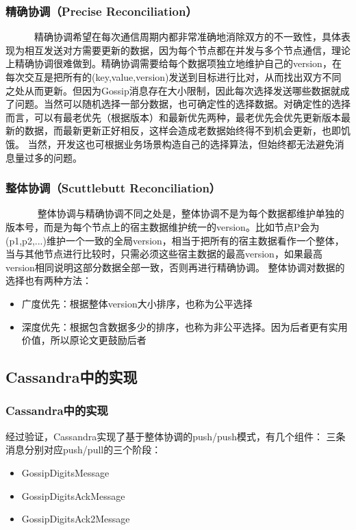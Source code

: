 \documentclass[slidestop,compress,mathserif,c]{beamer}
\begin{document}
\begin{frame}
\frametitle{精确协调（Precise Reconciliation）}
 ~~~~~~精确协调希望在每次通信周期内都非常准确地消除双方的不一致性，具体表现为相互发送对方需要更新的数据，因为每个节点都在并发与多个节点通信，理论上精确协调很难做到。精确协调需要给每个数据项独立地维护自己的version，在每次交互是把所有的(key,value,version)发送到目标进行比对，从而找出双方不同之处从而更新。但因为Gossip消息存在大小限制，因此每次选择发送哪些数据就成了问题。当然可以随机选择一部分数据，也可确定性的选择数据。对确定性的选择而言，可以有最老优先（根据版本）和最新优先两种，最老优先会优先更新版本最新的数据，而最新更新正好相反，这样会造成老数据始终得不到机会更新，也即饥饿。
当然，开发这也可根据业务场景构造自己的选择算法，但始终都无法避免消息量过多的问题。
\end{frame}

\begin{frame}
\frametitle{整体协调（Scuttlebutt Reconciliation）}
~~~~~~ 整体协调与精确协调不同之处是，整体协调不是为每个数据都维护单独的版本号，而是为每个节点上的宿主数据维护统一的version。比如节点P会为(p1,p2,...)维护一个一致的全局version，相当于把所有的宿主数据看作一个整体，当与其他节点进行比较时，只需必须这些宿主数据的最高version，如果最高version相同说明这部分数据全部一致，否则再进行精确协调。
整体协调对数据的选择也有两种方法：
\begin{itemize}
\item 广度优先：根据整体version大小排序，也称为公平选择
\item 深度优先：根据包含数据多少的排序，也称为非公平选择。因为后者更有实用价值，所以原论文更鼓励后者
\end{itemize}
\end{frame}

\subsection{\hfill Cassandra中的实现}
\begin{frame}
\frametitle{Cassandra中的实现}
 经过验证，Cassandra实现了基于整体协调的push/push模式，有几个组件：
三条消息分别对应push/pull的三个阶段：
\begin{itemize}
\item GossipDigitsMessage
\item GossipDigitsAckMessage
\item GossipDigitsAck2Message
\end{itemize}
\end{frame}
\end{document}
